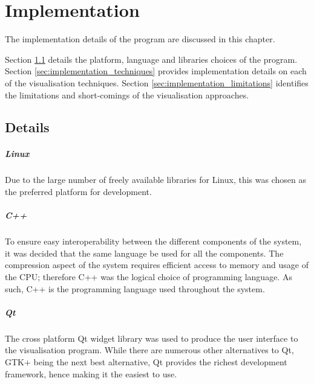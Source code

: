\graphicspath{{./implementation/}}

\chapter{Implementation}
\label{cha:implementation}

The implementation details of the program are discussed in this chapter.

Section \ref{sec:implementation_details} details the platform, language and
libraries choices of the program. Section \ref{sec:implementation_techniques}
provides implementation details on each of the visualisation techniques.
Section \ref{sec:implementation_limitations} identifies the limitations and
short-comings of the visualisation approaches.

\section{Details}
\label{sec:implementation_details}

\paragraph{Linux}

Due to the large number of freely available libraries for Linux, this was
chosen as the preferred platform for development.


\paragraph{C++}

To ensure easy interoperability between the different components of the system,
it was decided that the same language be used for all the components. The
compression aspect of the system requires efficient access to memory and usage
of the CPU; therefore C++ was the logical choice of programming language. As
such, C++ is the programming language used throughout the system.


\paragraph{Qt}

The cross platform Qt widget library \citep{Qt} was used to produce the user
interface to the visualisation program. While there are numerous other
alternatives to Qt, GTK+ being the next best alternative, Qt provides the
richest development framework, hence making it the easiest to use.

